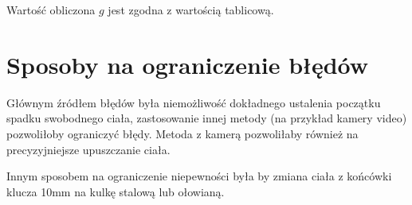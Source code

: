 \documentclass[a4paper,12pt]{article}
\begin{document}
Wartość obliczona $g$ jest zgodna z wartością tablicową.

\section{Sposoby na ograniczenie błędów}

Głównym źródłem błędów była niemożliwość dokładnego ustalenia początku spadku swobodnego ciała, zastosowanie innej metody (na przykład kamery video) pozwoliłoby ograniczyć błędy. Metoda z kamerą pozwoliłaby również na precyzyjniejsze upuszczanie ciała.

Innym sposobem na ograniczenie niepewności była by zmiana ciała z końcówki klucza 10mm na kulkę stalową lub ołowianą.
\end{document}
